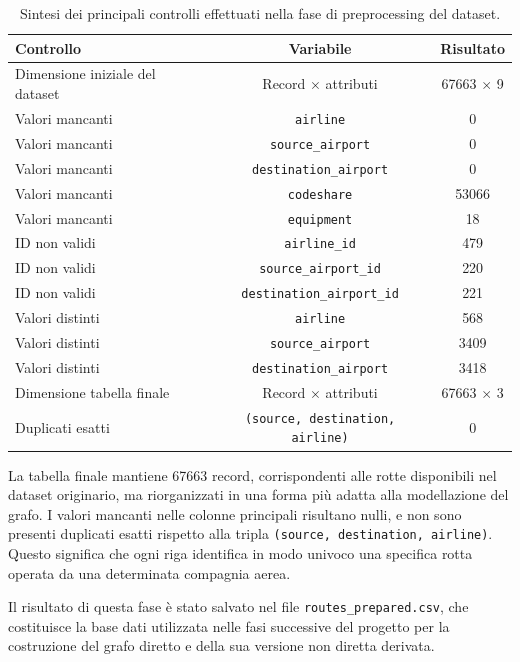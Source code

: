 \begin{table}[H]
\centering
\caption{Sintesi dei principali controlli effettuati nella fase di preprocessing del dataset.}
\label{tab:preprocessing_summary}
\begin{tabular}{lcc}
\toprule
\textbf{Controllo} & \textbf{Variabile} & \textbf{Risultato} \\
\midrule
Dimensione iniziale del dataset & Record $\times$ attributi & 67663 $\times$ 9 \\
Valori mancanti & \texttt{airline} & 0 \\
Valori mancanti & \texttt{source\_airport} & 0 \\
Valori mancanti & \texttt{destination\_airport} & 0 \\
Valori mancanti & \texttt{codeshare} & 53066 \\
Valori mancanti & \texttt{equipment} & 18 \\
ID non validi & \texttt{airline\_id} & 479 \\
ID non validi & \texttt{source\_airport\_id} & 220 \\
ID non validi & \texttt{destination\_airport\_id} & 221 \\
Valori distinti & \texttt{airline} & 568 \\
Valori distinti & \texttt{source\_airport} & 3409 \\
Valori distinti & \texttt{destination\_airport} & 3418 \\
Dimensione tabella finale & Record $\times$ attributi & 67663 $\times$ 3 \\
Duplicati esatti & \texttt{(source, destination, airline)} & 0 \\
\bottomrule
\end{tabular}
\end{table}

La tabella finale mantiene 67663 record, corrispondenti alle rotte disponibili nel dataset originario, ma riorganizzati in una forma più adatta alla modellazione del grafo. I valori mancanti nelle colonne principali risultano nulli, e non sono presenti duplicati esatti rispetto alla tripla \texttt{(source, destination, airline)}. Questo significa che ogni riga identifica in modo univoco una specifica rotta operata da una determinata compagnia aerea.

Il risultato di questa fase è stato salvato nel file \texttt{routes\_prepared.csv}, che costituisce la base dati utilizzata nelle fasi successive del progetto per la costruzione del grafo diretto e della sua versione non diretta derivata.